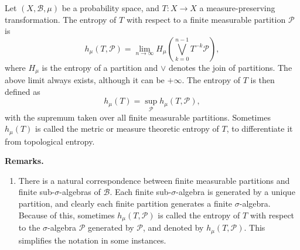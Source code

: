 \documentclass[12pt]{article}
\begin{document}
Let $(X,\mathscr{B},\mu)$ be a probability space, and $T\colon X\to X$ a measure-preserving transformation.
The entropy of $T$ with respect to a finite measurable partition $\mathcal{P}$ is
\[h_\mu(T,\mathcal{P})=\lim_{n\to\infty}H_\mu\left(\bigvee_{k=0}^{n-1} T^{-k}\mathcal{P}\right),\]
where $H_\mu$ is the entropy of a partition and $\vee$ denotes the join of partitions.
The above limit always exists, although it can be $+\infty$.
The entropy of $T$ is then defined as
\[h_\mu(T) = \sup_{\mathcal{P}} h_\mu(T,\mathcal{P}),\]
with the supremum taken over all finite measurable partitions.
Sometimes $h_\mu(T)$ is called the metric or measure theoretic entropy of $T$, to differentiate it from topological entropy.

\textbf{Remarks.}

\begin{enumerate}
        \item There is a natural correspondence between finite measurable partitions and finite
                sub-$\sigma$-algebras of $\mathscr{B}$. Each finite sub-$\sigma$-algebra is
                generated by a unique partition, and clearly each finite partition generates a finite $\sigma$-algebra.
                Because of this, sometimes $h_\mu(T,\mathcal{P})$ is called the entropy of $T$ with respect to
                the $\sigma$-algebra $\mathscr{P}$ generated by $\mathcal{P}$, and denoted by $h_\mu(T,\mathscr{P})$.
                This simplifies the notation in some instances.
\end{enumerate}
\end{document}
